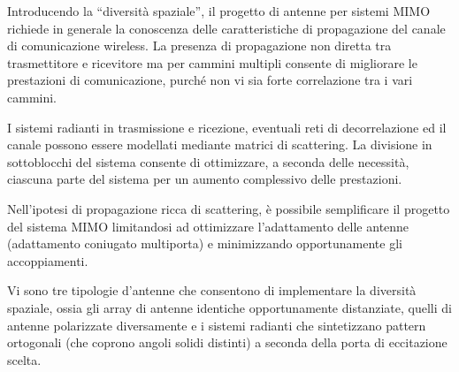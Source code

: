 \documentclass[technote]{IEEEtran}
\begin{document}
\par Introducendo la ``diversità spaziale'', il progetto di antenne per sistemi MIMO richiede in generale la conoscenza delle caratteristiche di propagazione del canale di comunicazione wireless. La presenza di propagazione non diretta tra trasmettitore e ricevitore ma per cammini multipli consente di migliorare le prestazioni di comunicazione, purché non vi sia forte correlazione tra i vari cammini.

 I sistemi radianti in trasmissione e ricezione, eventuali reti di decorrelazione ed il canale possono essere modellati mediante matrici di scattering. La divisione in sottoblocchi del sistema consente di ottimizzare, a seconda delle necessità, ciascuna parte del sistema per un aumento complessivo delle prestazioni. 
 
Nell'ipotesi di propagazione ricca di scattering, è possibile semplificare il progetto del sistema MIMO limitandosi ad ottimizzare l'adattamento delle antenne (adattamento coniugato multiporta) e minimizzando opportunamente gli accoppiamenti. 

Vi sono tre tipologie d'antenne che consentono di implementare la diversità spaziale, ossia gli array di antenne identiche opportunamente distanziate, quelli di antenne polarizzate diversamente e i sistemi radianti che sintetizzano pattern ortogonali (che coprono angoli solidi distinti) a seconda della porta di eccitazione scelta.

% 
% 
% 
% 

% 





\end{document}
